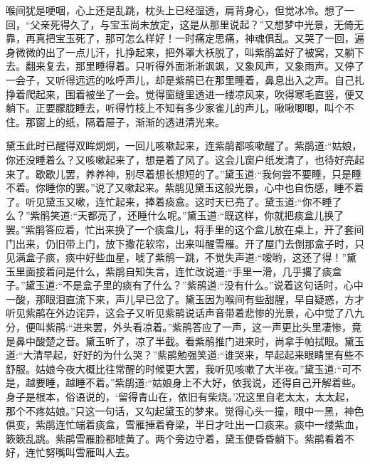 \begin{parag}
    喉间犹是哽咽，心上还是乱跳，枕头上已经湿透，肩背身心，但觉冰冷。想了一回，“父亲死得久了，与宝玉尚未放定，这是从那里说起？”又想梦中光景，无倚无靠，再真把宝玉死了，那可怎么样好！一时痛定思痛，神魂俱乱。又哭了一回，遍身微微的出了一点儿汗，扎挣起来，把外罩大袄脱了，叫紫鹃盖好了被窝，又躺下去。翻来复去，那里睡得着。只听得外面淅淅飒飒，又象风声，又象雨声。又停了一会子，又听得远远的吆呼声儿，却是紫鹃已在那里睡着，鼻息出入之声。自己扎挣着爬起来，围着被坐了一会。觉得窗缝里透进一缕凉风来，吹得寒毛直竖，便又躺下。正要朦胧睡去，听得竹枝上不知有多少家雀儿的声儿，啾啾唧唧，叫个不住。那窗上的纸，隔着屉子，渐渐的透进清光来。
\end{parag}


\begin{parag}
    黛玉此时已醒得双眸炯炯，一回儿咳嗽起来，连紫鹃都咳嗽醒了。紫鹃道:“姑娘，你还没睡着么？又咳嗽起来了，想是着了风了。这会儿窗户纸发清了，也待好亮起来了。歇歇儿罢，养养神，别尽着想长想短的了。”黛玉道:“我何尝不要睡，只是睡不着。你睡你的罢。”说了又嗽起来。紫鹃见黛玉这般光景，心中也自伤感，睡不着了。听见黛玉又嗽，连忙起来，捧着痰盒。这时天已亮了。黛玉道:“你不睡了么？”紫鹃笑道:“天都亮了，还睡什么呢。”黛玉道:“既这样，你就把痰盒儿换了罢。”紫鹃答应着，忙出来换了一个痰盒儿，将手里的这个盒儿放在桌上，开了套间门出来，仍旧带上门，放下撒花软帘，出来叫醒雪雁。开了屋门去倒那盒子时，只见满盒子痰，痰中好些血星，唬了紫鹃一跳，不觉失声道:“嗳哟，这还了得！”黛玉里面接着问是什么，紫鹃自知失言，连忙改说道:“手里一滑，几乎撂了痰盒子。”黛玉道:“不是盒子里的痰有了什么？”紫鹃道:“没有什么。”说着这句话时，心中一酸，那眼泪直流下来，声儿早已岔了。黛玉因为喉间有些甜腥，早自疑惑，方才听见紫鹃在外边诧异，这会子又听见紫鹃说话声音带着悲惨的光景，心中觉了八九分，便叫紫鹃:“进来罢，外头看凉着。”紫鹃答应了一声，这一声更比头里凄惨，竟是鼻中酸楚之音。黛玉听了，凉了半截。看紫鹃推门进来时，尚拿手帕拭眼。黛玉道:“大清早起，好好的为什么哭？”紫鹃勉强笑道:“谁哭来，早起起来眼睛里有些不舒服。姑娘今夜大概比往常醒的时候更大罢，我听见咳嗽了大半夜。”黛玉道:“可不是，越要睡，越睡不着。”紫鹃道:“姑娘身上不大好，依我说，还得自己开解着些。身子是根本，俗语说的，‘留得青山在，依旧有柴烧。’况这里自老太太，太太起，那个不疼姑娘。”只这一句话，又勾起黛玉的梦来。觉得心头一撞，眼中一黑，神色俱变，紫鹃连忙端着痰盒，雪雁捶着脊梁，半日才吐出一口痰来。痰中一缕紫血，簌簌乱跳。紫鹃雪雁脸都唬黄了。两个旁边守着，黛玉便昏昏躺下。紫鹃看着不好，连忙努嘴叫雪雁叫人去。
\end{parag}


